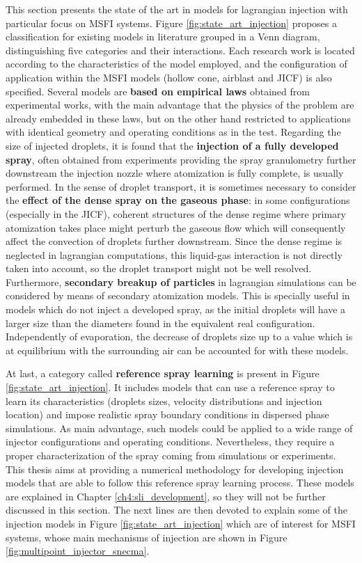 This section presents the state of the art in models for lagrangian injection with particular focus on MSFI systems. Figure \ref{fig:state_art_injection} proposes a classification for existing models in literature grouped in a Venn diagram, distinguishing five categories and their interactions. Each research work is located according to the characteristics of the model employed, and the configuration of application within the MSFI models (hollow cone, airblast and JICF) is also specified. Several models are \textbf{based on empirical laws} obtained from experimental works, with the main advantage that the physics of the problem are already embedded in these laws, but on the other hand restricted to applications with identical geometry and operating conditions as in the test. Regarding the size of injected droplets, it is found that the \textbf{injection of a fully developed spray}, often obtained from experiments providing the spray granulometry further downstream the injection nozzle where atomization is fully complete, is usually performed. In the sense of droplet transport, it is sometimes necessary to consider the \textbf{effect of the dense spray on the gaseous phase}: in some configurations (especially in the JICF), coherent structures of the dense regime where primary atomization takes place might perturb the gaseous flow which will consequently affect the convection of droplets further downstream. Since the dense regime is neglected in lagrangian computations, this liquid-gas interaction is not directly taken into account, so the droplet transport might not be well resolved. Furthermore,  \textbf{secondary breakup of particles} in lagrangian simulations can be considered by means of secondary atomization models. This is specially useful in models which do not inject a developed spray, as the initial droplets will have a larger size than the diameters found in the equivalent real configuration. Independently of evaporation, the decrease of droplets size up to a value which is at equilibrium with the surrounding air can be accounted for with these models.

At last, a category called \textbf{reference spray learning} is present in Figure \ref{fig:state_art_injection}. It includes models that can use a reference spray to learn its characteristics (droplets sizes, velocity distributions and injection location) and impose realistic spray boundary conditions in dispersed phase simulations. As main advantage, such models could be applied to a wide range of injector configurations and operating conditions. Nevertheless, they require a proper characterization of the spray coming from simulations or experiments. This thesis aims at providing a numerical methodology for developing injection models that are able to follow this reference spray learning process. These models are explained in Chapter \ref{ch4:sli_development}, so they will not be further discussed in this section. The next lines are then devoted to explain some of the injection models in Figure \ref{fig:state_art_injection} which are of interest for MSFI systems, whose main mechanisms of injection are shown in Figure \ref{fig:multipoint_injector_snecma}.

